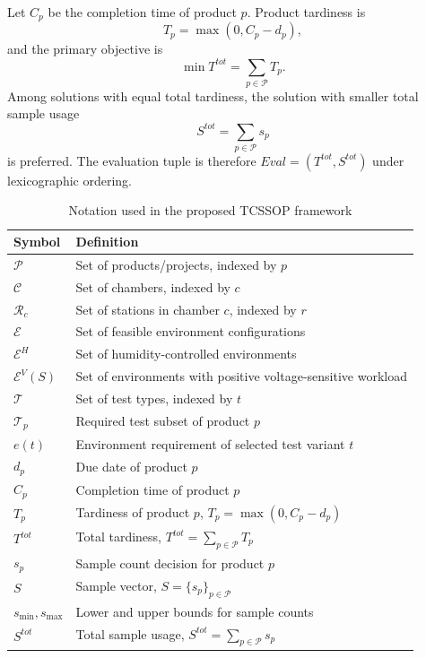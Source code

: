 \documentclass[11pt]{article}
\newcommand{\verycompacttable}{%
  \scriptsize
  \setlength{\tabcolsep}{2.2pt}%
  \renewcommand{\arraystretch}{0.80}%
}
\begin{document}
Let \(C_p\) be the completion time of product \(p\). Product tardiness is
\[
T_p=\max(0,C_p-d_p),
\]
and the primary objective is
\[
\min T^{tot}=\sum_{p\in\mathcal{P}}T_p.
\]
Among solutions with equal total tardiness, the solution with smaller total sample usage
\[
S^{tot}=\sum_{p\in\mathcal{P}}s_p
\]
is preferred. The evaluation tuple is therefore \(Eval=(T^{tot},S^{tot})\) under lexicographic ordering.

\begin{table}[H]
\centering
\caption{Notation used in the proposed TCSSOP framework}
\label{tab:notation_short}
\label{tab:notation_tcssop}
\verycompacttable
\begin{tabular}{|l|l|}
\hline
\textbf{Symbol} & \textbf{Definition} \\
\hline
\(\mathcal{P}\) & Set of products/projects, indexed by \(p\) \\ \hline
\(\mathcal{C}\) & Set of chambers, indexed by \(c\) \\ \hline
\(\mathcal{R}_c\) & Set of stations in chamber \(c\), indexed by \(r\) \\ \hline
\(\mathcal{E}\) & Set of feasible environment configurations \\ \hline
\(\mathcal{E}^{H}\) & Set of humidity-controlled environments \\ \hline
\(\mathcal{E}^{V}(S)\) & Set of environments with positive voltage-sensitive workload \\ \hline
\(\mathcal{T}\) & Set of test types, indexed by \(t\) \\ \hline
\(\mathcal{T}_p\) & Required test subset of product \(p\) \\ \hline
\(e(t)\) & Environment requirement of selected test variant \(t\) \\ \hline
\(d_p\) & Due date of product \(p\) \\ \hline
\(C_p\) & Completion time of product \(p\) \\ \hline
\(T_p\) & Tardiness of product \(p\), \(T_p=\max(0,C_p-d_p)\) \\ \hline
\(T^{tot}\) & Total tardiness, \(T^{tot}=\sum_{p\in\mathcal{P}}T_p\) \\ \hline
\(s_p\) & Sample count decision for product \(p\) \\ \hline
\(S\) & Sample vector, \(S=\{s_p\}_{p\in\mathcal{P}}\) \\ \hline
\(s_{\min},s_{\max}\) & Lower and upper bounds for sample counts \\ \hline
\(S^{tot}\) & Total sample usage, \(S^{tot}=\sum_{p\in\mathcal{P}}s_p\) \\ \hline

\end{tabular}
\end{table}
\end{document}
